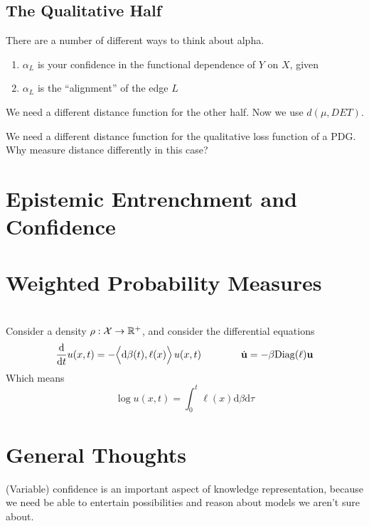 \documentclass{article}
\begin{document}
\subsection{The Qualitative Half}


There are a number of different ways to think about alpha.
\begin{enumerate}[nosep]
    \item $\alpha_L$ is your confidence in the functional dependence of $Y$ on $X$, given
    \item $\alpha_L$ is the ``alignment'' of the edge $L$
\end{enumerate}

We need a different distance function for the other half. Now we use
$d(\mu, DET)$.

%

We need a different distance function for the qualitative loss function of a PDG.
Why measure distance differently in this case?


\section{Epistemic Entrenchment and Confidence}
\section{Weighted Probability Measures}

\newpage
\section{}
Consider a density $\rho : \mathcal X \to \mathbb R^+$, and consider the differential equations
\[
    \frac{\mathrm d}{\mathrm d t} u(x,t)
    = - \Big\langle\mathrm d\beta(t), \ell(x) \Big\rangle
        \,
        {u(x,t)}
    \qquad\qquad%
    \dot {\mat u} = - \beta \mathrm{Diag}(\ell) \mat u
\]
Which means
\[
        \log u (x,t)
    = \int_{0}^{t}  \ell(x) \mathrm d \beta \mathrm d \tau
\]




\appendix
\section{General Thoughts}
(Variable) confidence is an important aspect of knowledge representation, because we need be able to entertain possibilities and reason about models we aren't sure about.
\end{document}
